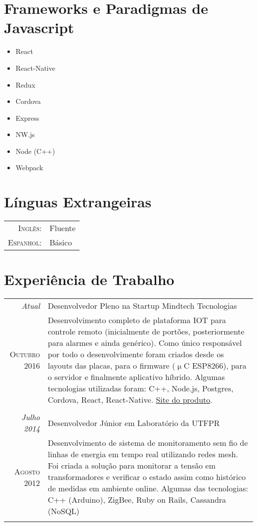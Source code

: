 \section{Frameworks e Paradigmas de Javascript}
\begin{multicols}{4}
	\begin{itemize}
		\item React
		\item React-Native
		\item Redux
		\item Cordova
		\item Express
		\item NW.js
		\item Node (C++)
		\item Webpack
	\end{itemize}
\end{multicols}

\section{Línguas Extrangeiras}
\begin{tabular}{rl}
	\textsc{Inglês:}&Fluente\\
	\textsc{Espanhol:}&Básico\\
\end{tabular}

\section{Experiência de Trabalho}
\begin{tabular}{r|p{11cm}}
	\emph{Atual} & Desenvolvedor Pleno na Startup Mindtech Tecnologias \\
	\textsc{Outubro 2016} &	\footnotesize{Desenvolvimento completo de plataforma IOT
	para controle	remoto (inicialmente de portões, posteriormente para alarmes e ainda
	genérico). Como único responsável por todo o desenvolvimente foram criados desde os
	layouts	das placas, para o firmware ($\upmu$C ESP8266), para o servidor e finalmente
	aplicativo híbrido. Algumas tecnologias utilizadas foram: C++, Node.js, Postgres,
	Cordova, React, React-Native. \href{http://mindtech.com.br/}{Site do produto}.}\\
	\multicolumn{2}{c}{} \\

	\emph{Julho 2014} & Desenvolvedor Júnior em Laboratório da UTFPR\\
	\textsc{Agosto 2012} & \footnotesize{Desenvolvimento de sistema de monitoramento
	sem fio de linhas de energia em tempo real utilizando redes mesh. Foi criada a
	solução para monitorar a tensão em transformadores e verificar o estado assim
	como histórico de medidas em ambiente online. Algumas das tecnologias: C++ (Arduino),
	ZigBee,	Ruby on Rails, Cassandra (NoSQL)}\\
	\multicolumn{2}{c}{} \\
\end{tabular}

